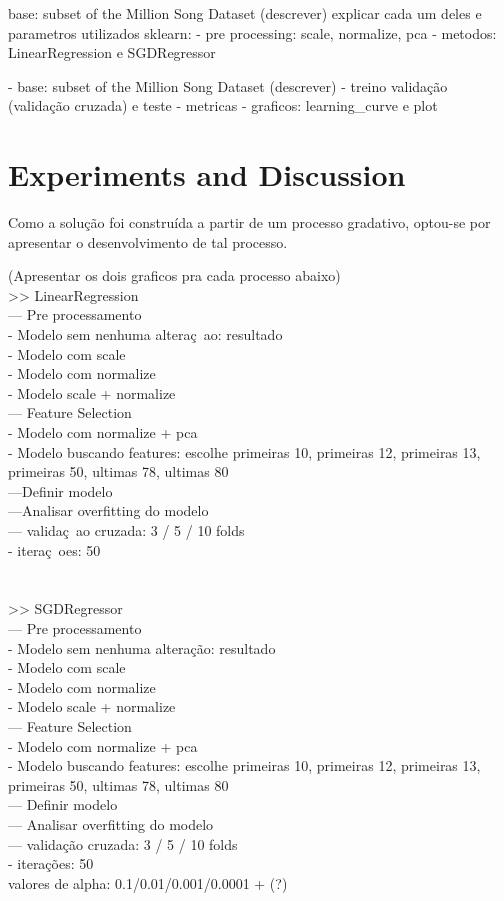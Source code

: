 \documentclass[conference]{IEEEtran}
\begin{document}
base: subset of the Million Song Dataset (descrever)
explicar cada um deles e parametros utilizados
sklearn:
- pre processing: scale, normalize, pca
- metodos: LinearRegression e SGDRegressor

- base: subset of the Million Song Dataset (descrever)
- treino validação (validação cruzada) e teste
- metricas
- graficos: learning\_curve e plot


\section{Experiments and Discussion}

Como a solução foi construída a partir de um processo gradativo, optou-se por apresentar o desenvolvimento de tal processo.

(Apresentar os dois graficos pra cada processo abaixo)\\

>> LinearRegression\\
--- Pre processamento\\
- Modelo sem nenhuma alteraç~ao: resultado\\
- Modelo com scale\\
- Modelo com normalize\\
- Modelo scale + normalize\\
--- Feature Selection\\
- Modelo com normalize + pca\\
- Modelo buscando features: escolhe primeiras 10, primeiras 12, primeiras 13, primeiras 50, ultimas 78, ultimas 80\\
---Definir modelo\\
---Analisar overfitting do modelo\\
--- validaç~ao cruzada: 3 / 5 / 10 folds\\
- iteraç~oes: 50\\
\\
\\
>> SGDRegressor \\
--- Pre processamento\\
- Modelo sem nenhuma alteração: resultado\\
- Modelo com scale\\
- Modelo com normalize\\
- Modelo scale + normalize\\
--- Feature Selection\\
- Modelo com normalize + pca\\
- Modelo buscando features: escolhe primeiras 10, primeiras 12, primeiras 13, primeiras 50, ultimas 78, ultimas 80\\
--- Definir modelo\\
--- Analisar overfitting do modelo\\
--- validação cruzada: 3 / 5 / 10 folds\\
- iterações: 50\\
valores de alpha: 0.1/0.01/0.001/0.0001 + (?)\\
\end{document}
